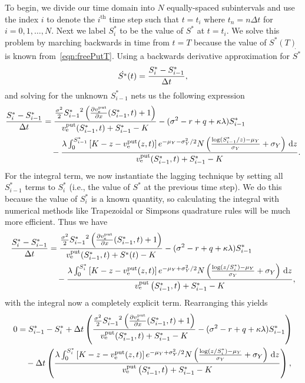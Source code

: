 To begin, we divide our time domain into $N$ equally-spaced subintervals and use the index $i$ to denote the $i^{\text{th}}$ time step such that $t = t_i$ where $t_n = n\Delta t$ for $i = 0,1,\ldots,N$. Next we label $S^*_i$ to be the value of $S^*$ at $t = t_i$. We solve this problem by marching backwards in time from $t = T$ because the value of $S^*(T)$ is known from~\eqref{eqn:freePutT}. Using a backwards derivative approximation for $\dot{S^*}$
	$$
		\dot{S^*}(t) = \frac{S^*_i - S^*_{i-1}}{\Delta t},
	$$
and solving for the unknown $S^*_{i-1}$ nets us the following expression
	\begin{align*}
		\frac{S^*_i - S^*_{i-1}}{\Delta t} &= \frac{\frac{\sigma^2}{2}{S^*_{i-1}}^2\left( \frac{\partial  v_{\text{e}}^{\text{put}} }{\partial x}(S^*_{i-1},t) + 1\right)}{ v_{\text{e}}^{\text{put}}(S^*_{i-1},t) + S^*_{i-1} - K} - (\sigma^2 - r + q +\kappa\lambda)S^*_{i-1}  \\
				&\quad{} - \frac{\lambda\int_0^{S^*_{i-1}} \left[K - z -  v_{\text{e}}^{\text{put}}(z,t)\right]  e^{-\mu_Y - \sigma_Y^2/2}N\left( \frac{\log(S^*_{i-1}/z) - \mu_Y}{\sigma_Y} + \sigma_Y \right) \, \mathrm d z}{ v_{\text{e}}^{\text{put}}(S^*_{i-1},t) + S^*_{i-1} - K} .
	\end{align*}
For the integral term, we now instantiate the lagging technique by setting all $S^*_{i-1}$ terms to $S^*_{i}$ (i.e., the value of $S^*$ at the previous time step). We do this because the value of $S^*_i$ is a known quantity, so calculating the integral with numerical methods like Trapezoidal or Simpsons quadrature rules will be much more efficient.	 Thus we have
	\begin{align*}
		\frac{S^*_i - S^*_{i-1}}{\Delta t} &= \frac{\frac{\sigma^2}{2}{S^*_{i-1}}^2\left( \frac{\partial  v_{\text{e}}^{\text{put}} }{\partial x}(S^*_{i-1},t) + 1\right)}{ v_{\text{e}}^{\text{put}}(S^*_{i-1},t) + S^*(t) - K} - (\sigma^2 - r + q +\kappa\lambda)S^*_{i-1}  \\
				&\quad{} - \frac{\lambda\int_0^{S^*_{i}} \left[K - z -  v_{\text{e}}^{\text{put}}(z,t)\right]  e^{-\mu_Y + \sigma_Y^2/2}N\left( \frac{\log(z/S^*_{i}) - \mu_Y}{\sigma_Y} + \sigma_Y \right) \, \mathrm d z}{ v_{\text{e}}^{\text{put}}\left(S^*_{i-1},t\right) + S^*_{i-1} - K},
	\end{align*}
with the integral now a completely explicit term. Rearranging this yields
	\begin{equation}
		\label{eqn:SApproxPut2}
		\begin{split}
		0 &= S_{i-1}^* - S^*_i + \Delta t \left( \frac{\frac{\sigma^2}{2}{S^*_{i-1}}^2\left( \frac{\partial  v_{\text{e}}^{\text{put}} }{\partial x}(S^*_{i-1},t) + 1\right)}{ v_{\text{e}}^{\text{put}}(S^*_{i-1},t) + S^*_{i-1} - K} - (\sigma^2 - r + q +\kappa\lambda)S^*_{i-1} \right)  \\
				&\quad{} - \Delta t \left( \frac{\lambda\int_0^{S^*_{i}} \left[K - z -  v_{\text{e}}^{\text{put}}(z,t)\right]  e^{-\mu_Y + \sigma_Y^2/2}N\left( \frac{\log(z/S^*_{i}) - \mu_Y}{\sigma_Y} + \sigma_Y \right) \, \mathrm d z}{ v_{\text{e}}^{\text{put}}\left(S^*_{i-1},t\right) + S^*_{i-1} - K} \right),
		\end{split}
	\end{equation}
